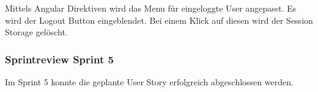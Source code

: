  Mittels Angular Direktiven wird das Menu für eingeloggte User angepasst. Es wird der Logout Button eingeblendet. Bei einem Klick auf diesen wird der Session Storage gelöscht. 
 
\subsubsection{Sprintreview Sprint 5}
 Im Sprint 5 konnte die geplante User Story erfolgreich abgeschlossen werden.
 
 
 
 
\newpage
